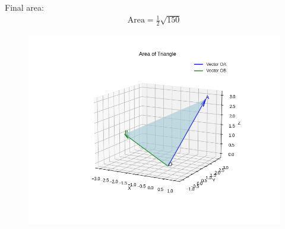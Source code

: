 \documentclass{article}
\begin{document}
Final area:
\begin{align}
\text{Area} = \frac{1}{2} \sqrt{150}
\end{align}

\begin{figure}[H]
    \centering
    \includegraphics[width=1\linewidth]{figs/Figure_1.png}
    \caption{}
    \label{fig:fig1}
\end{figure}
\end{document}
